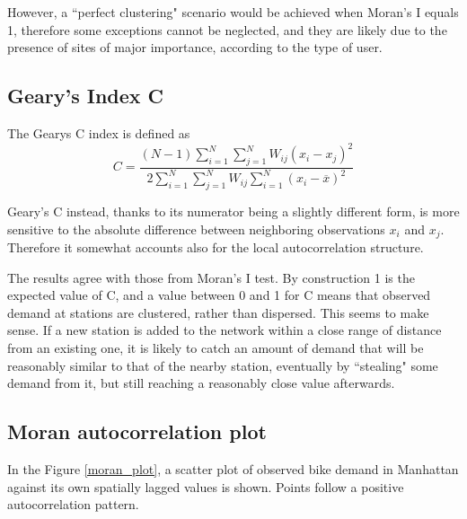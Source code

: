 \documentclass[12pt]{article}
\begin{document}
\noindent
However, a ``perfect clustering" scenario would be achieved when Moran's I equals 1, therefore some exceptions cannot be neglected, and they are likely due to the presence of sites of major importance, according to the type of user.

\subsection{Geary's Index C}
The Gearys C index is defined as
$$
C = \displaystyle{\frac{(N-1)\displaystyle\sum_{i=1}^{N}\sum_{j=1}^{N} W_{ij}(x_{i}-x_{j})^{2}}{2\displaystyle\sum_{i=1}^{N}\sum_{j=1}^{N}W_{ij}\displaystyle\sum_{i=1}^{N}(x_{i}-\overline{x})^2}}
$$

\noindent
Geary's C instead, thanks to its numerator being a slightly different form, is more sensitive to the absolute difference between neighboring observations $x_i$ and $x_j$. Therefore it somewhat accounts also for the local autocorrelation structure.

	\begin{figure}[H]
	\centering
	\end{figure}

\noindent	
The results agree with those from Moran's I test. By construction 1 is the expected value of C, and a value between 0 and 1 for C means that observed demand at stations are clustered, rather than dispersed.
This seems to make sense. If a new station is added to the network within a close range of distance from an existing one, it is likely to catch an amount of demand that will be reasonably similar to that of the nearby station, eventually by ``stealing" some demand from it, but still reaching a reasonably close value afterwards.
	
\subsection{Moran autocorrelation plot}
In the Figure \ref{moran_plot}, a scatter plot of observed bike demand in Manhattan against its own spatially lagged values is shown. Points follow a positive autocorrelation pattern.
	
\end{document}
